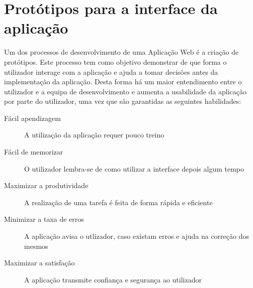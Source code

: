 \section{Protótipos para a interface da aplicação}

Um dos processos de desenvolvimento de uma Aplicação Web é a criação de protótipos. Este processo tem como objetivo demonstrar de que forma o utilizador interage com a aplicação e ajuda a tomar decisões antes da implementação da aplicação. Desta forma há um maior entendimento entre o utilizador e a equipa de desenvolvimento e aumenta a usabilidade da aplicação por parte do utilizador, uma vez que são garantidas as seguintes habilidades:

\begin{description}
	\item[Fácil apendizagem] A utilização da aplicação requer pouco treino
	\item[Fácil de memorizar] O utilizador lembra-se de como utilizar a interface depois algum tempo
	\item[Maximizar a produtividade] A realização de uma tarefa é feita de forma rápida e eficiente
	\item[Minimizar a taxa de erros] A aplicação avisa o utlizador, caso existam erros e ajuda na correção dos mesmos
	\item[Maximizar a satisfação] A aplicação transmite confiança e segurança ao utilizador
\end{description}




